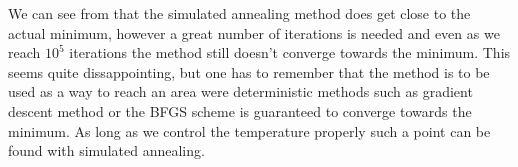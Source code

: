         We can see from  that the
        simulated annealing method does get close to the actual minimum,
        however a great number of iterations is needed and even as we reach
        $10^5$ iterations the method still doesn't converge towards the
        minimum. This seems quite dissappointing, but one has to remember that
        the method is to be used as a way to reach an area were deterministic
        methods such as gradient descent method or the BFGS scheme is
        guaranteed to converge towards the minimum. As long as we control the
        temperature properly such a point can be found with simulated
        annealing.
